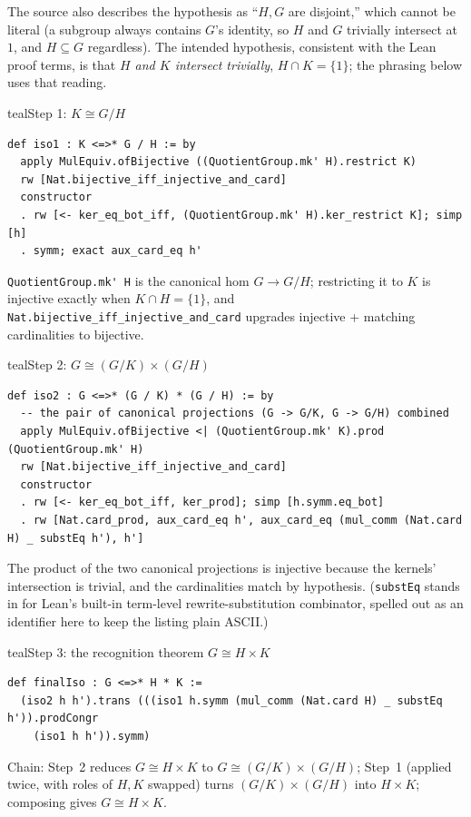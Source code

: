 \documentclass[11pt]{article}
\begin{document}
\begin{auditnote}
The source also describes the hypothesis as ``$H,G$ are disjoint,'' which cannot be literal (a subgroup always contains $G$'s identity, so $H$ and $G$ trivially intersect at $1$, and $H\subseteq G$ regardless). The intended hypothesis, consistent with the Lean proof terms, is that \emph{$H$ and $K$ intersect trivially}, $H\cap K=\{1\}$; the phrasing below uses that reading.
\end{auditnote}

\begin{defbox}{teal}{Step 1: \texorpdfstring{$K\cong G/H$}{K iso G/H}}
\begin{lstlisting}
def iso1 : K <=>* G / H := by
  apply MulEquiv.ofBijective ((QuotientGroup.mk' H).restrict K)
  rw [Nat.bijective_iff_injective_and_card]
  constructor
  . rw [<- ker_eq_bot_iff, (QuotientGroup.mk' H).ker_restrict K]; simp [h]
  . symm; exact aux_card_eq h'
\end{lstlisting}
\verb|QuotientGroup.mk' H| is the canonical hom $G\to G/H$; restricting it to $K$ is injective exactly when $K\cap H=\{1\}$, and \verb|Nat.bijective_iff_injective_and_card| upgrades injective + matching cardinalities to bijective.
\end{defbox}

\begin{defbox}{teal}{Step 2: \texorpdfstring{$G\cong (G/K)\times (G/H)$}{G iso (G/K) x (G/H)}}
\begin{lstlisting}
def iso2 : G <=>* (G / K) * (G / H) := by
  -- the pair of canonical projections (G -> G/K, G -> G/H) combined
  apply MulEquiv.ofBijective <| (QuotientGroup.mk' K).prod (QuotientGroup.mk' H)
  rw [Nat.bijective_iff_injective_and_card]
  constructor
  . rw [<- ker_eq_bot_iff, ker_prod]; simp [h.symm.eq_bot]
  . rw [Nat.card_prod, aux_card_eq h', aux_card_eq (mul_comm (Nat.card H) _ substEq h'), h']
\end{lstlisting}
The product of the two canonical projections is injective because the kernels' intersection is trivial, and the cardinalities match by hypothesis. (\verb|substEq| stands in for Lean's built-in term-level rewrite-substitution combinator, spelled out as an identifier here to keep the listing plain ASCII.)
\end{defbox}

\begin{defbox}{teal}{Step 3: the recognition theorem \texorpdfstring{$G\cong H\times K$}{G iso H x K}}
\begin{lstlisting}
def finalIso : G <=>* H * K :=
  (iso2 h h').trans (((iso1 h.symm (mul_comm (Nat.card H) _ substEq h')).prodCongr
    (iso1 h h')).symm)
\end{lstlisting}
Chain: Step~2 reduces $G\cong H\times K$ to $G\cong (G/K)\times(G/H)$; Step~1 (applied twice, with roles of $H,K$ swapped) turns $(G/K)\times(G/H)$ into $H\times K$; composing gives $G\cong H\times K$.
\end{defbox}
\end{document}

